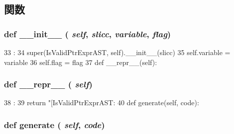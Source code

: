 \subsection{関数}
\hypertarget{classslicc_1_1ast_1_1IsValidPtrExprAST_1_1IsValidPtrExprAST_ac775ee34451fdfa742b318538164070e}{
\subsubsection[{\_\-\_\-init\_\-\_\-}]{\setlength{\rightskip}{0pt plus 5cm}def \_\-\_\-init\_\-\_\- ( {\em self}, \/   {\em slicc}, \/   {\em variable}, \/   {\em flag})}}
\label{classslicc_1_1ast_1_1IsValidPtrExprAST_1_1IsValidPtrExprAST_ac775ee34451fdfa742b318538164070e}



\begin{DoxyCode}
33                                              :
34         super(IsValidPtrExprAST, self).__init__(slicc)
35         self.variable = variable
36         self.flag = flag
37 
    def __repr__(self):
\end{DoxyCode}
\hypertarget{classslicc_1_1ast_1_1IsValidPtrExprAST_1_1IsValidPtrExprAST_ad8b9328939df072e4740cd9a63189744}{
\subsubsection[{\_\-\_\-repr\_\-\_\-}]{\setlength{\rightskip}{0pt plus 5cm}def \_\-\_\-repr\_\-\_\- ( {\em self})}}
\label{classslicc_1_1ast_1_1IsValidPtrExprAST_1_1IsValidPtrExprAST_ad8b9328939df072e4740cd9a63189744}



\begin{DoxyCode}
38                       :
39         return "[IsValidPtrExprAST: %
40 
    def generate(self, code):
\end{DoxyCode}
\hypertarget{classslicc_1_1ast_1_1IsValidPtrExprAST_1_1IsValidPtrExprAST_a4555d1cee0dccf3942ea35fe86de2e8e}{
\subsubsection[{generate}]{\setlength{\rightskip}{0pt plus 5cm}def generate ( {\em self}, \/   {\em code})}}
\label{classslicc_1_1ast_1_1IsValidPtrExprAST_1_1IsValidPtrExprAST_a4555d1cee0dccf3942ea35fe86de2e8e}



